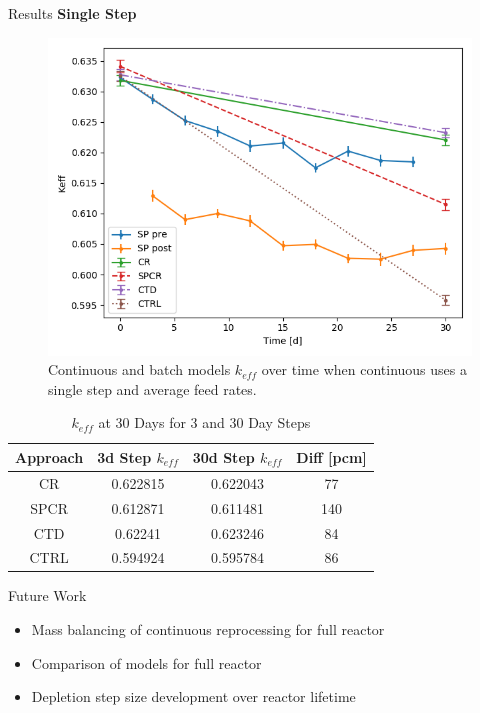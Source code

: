 \documentclass[final]{beamer}
\newlength{\onecolwid}
\newlength{\threecolwid}
\begin{document}
\begin{frame}[t]
\begin{columns}[t,totalwidth=\threecolwid]
\begin{column}{\onecolwid}
\begin{block}{Results}
\textbf{Single Step}
\begin{figure}
	\label{fig:keff_30d_batch}
	\includegraphics[width=0.9\linewidth]{images/cumulative_keff_coont.png}
	\caption{Continuous and batch models $k_{eff}$ over time when continuous uses a single step and average feed rates.}
\end{figure}

\begin{table}[H]
\renewcommand{\arraystretch}{1.25}
\caption{$k_{eff}$ at 30 Days for 3 and 30 Day Steps}
\label{tab:keff_vals}
\begin{tabular}{ | c | c | c | c | }
 \hline
 Approach & 3d Step $k_{eff}$ & 30d Step $k_{eff}$ & Diff [pcm]\\
 \hline
 \hline
 CR & 0.622815 & 0.622043 & 77\\
 SPCR & 0.612871 & 0.611481 & 140\\
 CTD & 0.62241 & 0.623246 & 84\\
 CTRL & 0.594924 & 0.595784 & 86\\

 \hline
\end{tabular}
\end{table}



\end{block}



\begin{alertblock}{Future Work }
\begin{itemize}
		\item Mass balancing of continuous reprocessing for full reactor
		\item Comparison of models for full reactor
		\item Depletion step size development over reactor lifetime
\end{itemize}


\end{alertblock}
\end{column}
\end{columns}
\end{frame}
\end{document}
